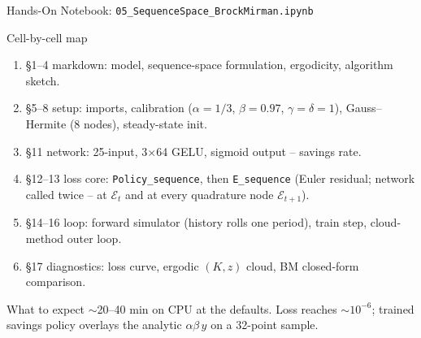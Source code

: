 \documentclass[aspectratio=169,11pt]{beamer}
\newcommand{\emphc}[1]{\textcolor{harvardcrimson}{#1}}
\newcommand{\E}{\mathcal{E}}
\begin{document}
\begin{frame}{Hands-On Notebook: \texttt{05\_SequenceSpace\_BrockMirman.ipynb}}
\footnotesize
\begin{block}{Cell-by-cell map}
\vspace{-2pt}\begin{enumerate}\itemsep0pt
    \item \emphc{\S 1--4 markdown:} model, sequence-space formulation, ergodicity, algorithm sketch.
    \item \emphc{\S 5--8 setup:} imports, calibration ($\alpha = 1/3$, $\beta = 0.97$, $\gamma = \delta = 1$), Gauss--Hermite (8 nodes), steady-state init.
    \item \emphc{\S 11 network:} 25-input, 3$\times$64 GELU, sigmoid output -- savings rate.
    \item \emphc{\S 12--13 loss core:} \texttt{Policy\_sequence}, then \texttt{E\_sequence} (Euler residual; network called twice -- at $\E_t$ and at every quadrature node $\E_{t+1}$).
    \item \emphc{\S 14--16 loop:} forward simulator (history rolls one period), train step, cloud-method outer loop.
    \item \emphc{\S 17 diagnostics:} loss curve, ergodic $(K, z)$ cloud, BM closed-form comparison.
\end{enumerate}
\end{block}
\vspace{-2pt}
\begin{block}{What to expect}
\vspace{-2pt}$\sim$20--40 min on CPU at the defaults.  Loss reaches $\sim 10^{-6}$; trained savings policy overlays the analytic $\alpha\beta\,y$ on a 32-point sample.
\end{block}
\end{frame}


\end{document}
